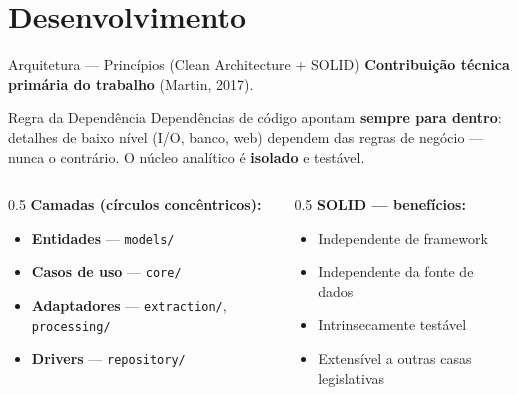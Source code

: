 \documentclass{beamer}
\begin{document}
\section{Desenvolvimento}

\begin{frame}{Arquitetura — Princípios (Clean Architecture + SOLID)}
\textbf{Contribuição técnica primária do trabalho} (Martin, 2017).

\vspace{0.3cm}
\begin{block}{Regra da Dependência}
Dependências de código apontam \textbf{sempre para dentro}: detalhes de baixo nível (I/O, banco, web) dependem das regras de negócio — nunca o contrário. O núcleo analítico é \textbf{isolado} e testável.
\end{block}

\begin{columns}
\begin{column}{0.5\textwidth}
\textbf{Camadas (círculos concêntricos):}
\begin{itemize}\footnotesize
  \item \textbf{Entidades} — \texttt{models/}
  \item \textbf{Casos de uso} — \texttt{core/}
  \item \textbf{Adaptadores} — \texttt{extraction/}, \texttt{processing/}
  \item \textbf{Drivers} — \texttt{repository/}
\end{itemize}
\end{column}
\begin{column}{0.5\textwidth}
\textbf{SOLID — benefícios:}
\begin{itemize}\footnotesize
  \item Independente de framework
  \item Independente da fonte de dados
  \item Intrinsecamente testável
  \item Extensível a outras casas legislativas
\end{itemize}
\end{column}
\end{columns}
\end{frame}
\end{document}
